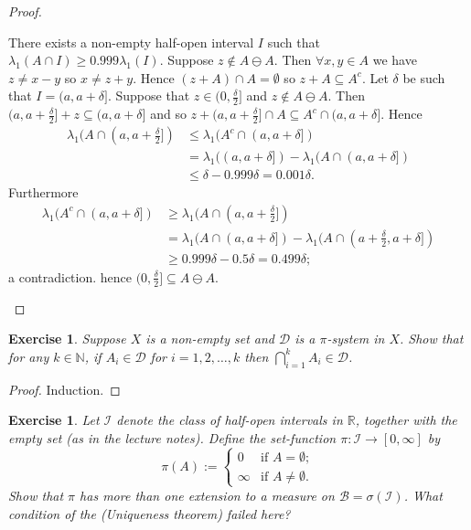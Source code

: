 \documentclass{article}
\newtheorem{exercise}[theorem]{Exercise}
\begin{document}
\begin{proof}
\begin{enumerate}
    There exists a non-empty half-open interval $I$ such that $\lambda_1(A\cap I)\geq0.999\lambda_1(I)$. Suppose $z\not\in A\ominus A$. Then $\forall x,y\in A$ we have $z\neq x-y$ so $x\neq z+y$. Hence $(z+A)\cap A=\emptyset$ so $z+A\subseteq A^c$. Let $\delta$ be such that $I=(a,a+\delta]$. Suppose that $z\in(0,\frac{\delta}{2}]$ and $z\not\in A\ominus A$. Then $(a,a+\frac{\delta}{2}]+z\subseteq(a,a+\delta]$ and so $z+(a,a+\frac{\delta}{2}]\cap A\subseteq A^c\cap(a,a+\delta]$. Hence \begin{align*}\lambda_1(A\cap(a,a+\frac{\delta}{2}])&\leq\lambda_1(A^c\cap(a,a+\delta])\\&=\lambda_1((a,a+\delta])-\lambda_1(A\cap(a,a+\delta])\\&\leq \delta-0.999\delta=0.001\delta.\end{align*} Furthermore \begin{align*}\lambda_1(A^c\cap(a,a+\delta])&\geq\lambda_1(A\cap(a,a+\frac{\delta}{2}])\\&=\lambda_1(A\cap(a,a+\delta])-\lambda_1(A\cap(a+\frac{\delta}{2},a+\delta])\\&\geq0.999\delta-0.5\delta=0.499\delta;\end{align*} a contradiction. hence $(0,\frac{\delta}{2}]\subseteq A\ominus A$.
\end{enumerate}


\end{proof}
\begin{exercise}
    Suppose $X$ is a non-empty set and $\mathcal{D}$ is a $\pi$-system in $X$. Show that for any $k \in \mathbb{N}$, if $A_i \in \mathcal{D}$ for $i = 1, 2, \ldots, k$ then $\bigcap_{i=1}^{k} A_i \in \mathcal{D}$.
\end{exercise}
\begin{proof}
Induction.
\end{proof}
\begin{exercise}
    Let $\mathcal{I}$ denote the class of half-open intervals in $\mathbb{R}$, together with the empty set (as in the lecture notes). Define the set-function $\pi : \mathcal{I} \to [0, \infty]$ by
    \[
    \pi(A) :=
    \begin{cases}
        0 & \text{if } A = \emptyset; \\
        \infty & \text{if } A \neq \emptyset.
    \end{cases}
    \]
    Show that $\pi$ has more than one extension to a measure on $\mathcal{B} = \sigma(\mathcal{I})$. What condition of the (Uniqueness theorem) failed here?
\end{exercise}
\end{document}
